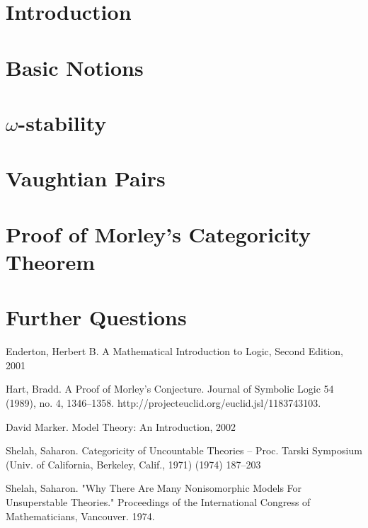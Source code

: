 \documentclass[12pt]{article}
\theoremstyle{definition}
\theoremstyle{definition}
\theoremstyle{plain}
\theoremstyle{remark}
\numberwithin{equation}{section}
\begin{document}

%
%
\tableofcontents
\newpage

\pagestyle{myheadings} \markright{}

%

\section{Introduction}

\newpage

\section{Basic Notions}

\newpage

\section{\(\omega\)-stability}

\newpage

\section{Vaughtian Pairs}

\newpage

\section{Proof of Morley's Categoricity Theorem}

\newpage

\section{Further Questions}

\newpage

%

\begin{thebibliography} \small
%
Enderton, Herbert B. A Mathematical Introduction to Logic, Second Edition, 2001 

Hart, Bradd. A Proof of Morley's Conjecture. Journal of Symbolic Logic 54 (1989), no. 4, 1346--1358. http://projecteuclid.org/euclid.jsl/1183743103.

 David Marker. Model Theory: An Introduction, 2002

 Shelah, Saharon. Categoricity of Uncountable Theories -- Proc. Tarski Symposium (Univ. of California, Berkeley, Calif., 1971) (1974) 187--203

 Shelah, Saharon. "Why There Are Many Nonisomorphic Models For Unsuperstable Theories." Proceedings of the International Congress of Mathematicians, Vancouver. 1974.

%
\end{thebibliography}
\end{document}
